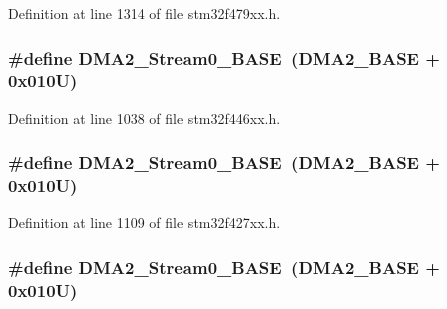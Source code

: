 Definition at line 1314 of file stm32f479xx.\+h.

\subsubsection[{\texorpdfstring{D\+M\+A2\+\_\+\+Stream0\+\_\+\+B\+A\+SE}{DMA2_Stream0_BASE}}]{\setlength{\rightskip}{0pt plus 5cm}\#define D\+M\+A2\+\_\+\+Stream0\+\_\+\+B\+A\+SE~({\bf D\+M\+A2\+\_\+\+B\+A\+SE} + 0x010\+U)}\hypertarget{group___peripheral__memory__map_gac4c67b24726ba6b94d03adb351bcec4d}{}\label{group___peripheral__memory__map_gac4c67b24726ba6b94d03adb351bcec4d}


Definition at line 1038 of file stm32f446xx.\+h.

\subsubsection[{\texorpdfstring{D\+M\+A2\+\_\+\+Stream0\+\_\+\+B\+A\+SE}{DMA2_Stream0_BASE}}]{\setlength{\rightskip}{0pt plus 5cm}\#define D\+M\+A2\+\_\+\+Stream0\+\_\+\+B\+A\+SE~({\bf D\+M\+A2\+\_\+\+B\+A\+SE} + 0x010\+U)}\hypertarget{group___peripheral__memory__map_gac4c67b24726ba6b94d03adb351bcec4d}{}\label{group___peripheral__memory__map_gac4c67b24726ba6b94d03adb351bcec4d}


Definition at line 1109 of file stm32f427xx.\+h.

\subsubsection[{\texorpdfstring{D\+M\+A2\+\_\+\+Stream0\+\_\+\+B\+A\+SE}{DMA2_Stream0_BASE}}]{\setlength{\rightskip}{0pt plus 5cm}\#define D\+M\+A2\+\_\+\+Stream0\+\_\+\+B\+A\+SE~({\bf D\+M\+A2\+\_\+\+B\+A\+SE} + 0x010\+U)}\hypertarget{group___peripheral__memory__map_gac4c67b24726ba6b94d03adb351bcec4d}{}\label{group___peripheral__memory__map_gac4c67b24726ba6b94d03adb351bcec4d}


